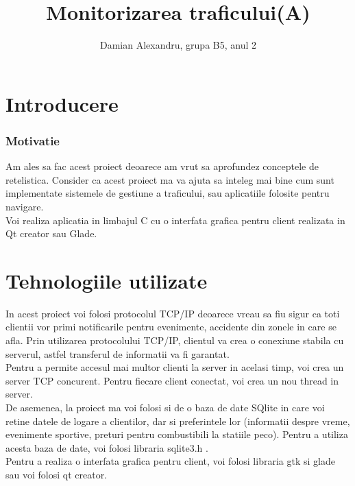 \documentclass[runningheads]{llncs}
\begin{document}
\title{Monitorizarea traficului(A)}
\author{Damian Alexandru, grupa B5, anul 2}
\maketitle





\section {Introducere}
\subsubsection{Motivatie}
Am ales sa fac acest proiect deoarece am vrut sa aprofundez conceptele de retelistica. Consider ca acest proiect ma va ajuta sa inteleg mai bine cum sunt implementate sistemele de gestiune a traficului, sau aplicatiile folosite pentru navigare.\\

Voi realiza aplicatia in limbajul C cu o interfata grafica pentru client realizata in Qt creator sau Glade.

\section {Tehnologiile utilizate}

In acest proiect voi folosi protocolul TCP/IP deoarece vreau sa fiu sigur ca toti clientii vor primi notificarile pentru evenimente, accidente din zonele in care se afla. Prin utilizarea protocolului TCP/IP, clientul va crea o conexiune stabila cu serverul, astfel transferul de informatii va fi garantat.\\

Pentru a permite accesul mai multor clienti la server in acelasi timp, voi crea un server TCP concurent. Pentru fiecare client conectat, voi crea un nou thread in server.\\

De asemenea, la proiect ma voi folosi si de o baza de date SQlite in care voi retine datele de logare a clientilor, dar si preferintele lor (informatii despre vreme, evenimente sportive, preturi pentru combustibili la statiile peco). Pentru a utiliza acesta baza de date, voi folosi libraria sqlite3.h .\\

Pentru a realiza o interfata grafica pentru client, voi folosi libraria gtk si glade sau voi folosi qt creator.\\
\end{document}
